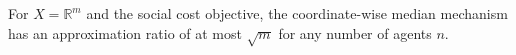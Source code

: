 \begin{lemma} \cite{Meir2019}
For $X=\mathbb{R}^m$ and  the social cost objective, the coordinate-wise median mechanism has an approximation ratio of at most $\sqrt{m}$ for any number of agents $n$.
\end{lemma}











